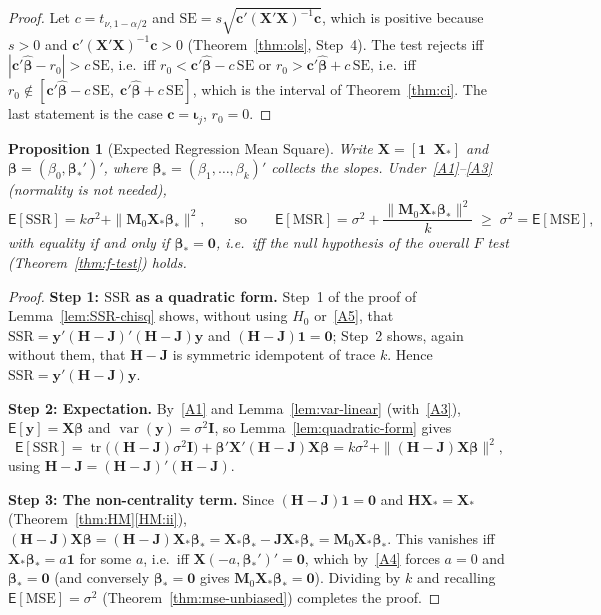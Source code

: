 \documentclass[14pt]{extarticle}
\theoremstyle{plain}
\newtheorem{proposition}[theorem]{Proposition}
\theoremstyle{definition}
\theoremstyle{remark}
\newcommand\expc{\mathsf{E}}
\DeclareMathOperator\var{var}
\DeclareMathOperator\tr{tr}
\newcommand{\SSR}{\mathrm{SSR}}
\newcommand{\MSR}{\mathrm{MSR}}
\newcommand{\MSE}{\mathrm{MSE}}
\newcommand{\SE}{\mathrm{SE}}
\newcommand{\bX}{\mathbf{X}}
\newcommand{\by}{\mathbf{y}}
\def\bb{\boldsymbol{\beta}}
\newcommand{\bI}{\mathbf{I}}
\newcommand{\bH}{\mathbf{H}}
\newcommand{\bM}{\mathbf{M}}
\def\bc{\mathbf{c}}
\newcommand{\bone}{\mathbf{1}}
\newcommand{\bzero}{\mathbf{0}}
\newcommand{\bJ}{\mathbf{J}}
\begin{document}
\begin{proof}
Let $c = t_{\nu,1-\alpha/2}$ and $\SE = s\sqrt{\bc'(\bX'\bX)^{-1}\bc}$, which is positive because $s > 0$ and $\bc'(\bX'\bX)^{-1}\bc > 0$ (Theorem~\ref{thm:ols}, Step~4). The test rejects iff $|\bc'\hat{\bb} - r_0| > c\,\SE$, i.e.\ iff $r_0 < \bc'\hat{\bb} - c\,\SE$ or $r_0 > \bc'\hat{\bb} + c\,\SE$, i.e.\ iff $r_0 \notin [\bc'\hat{\bb} - c\,\SE,\; \bc'\hat{\bb} + c\,\SE]$, which is the interval of Theorem~\ref{thm:ci}. The last statement is the case $\bc = \boldsymbol\iota_j$, $r_0 = 0$.
\end{proof}

\begin{proposition}[Expected Regression Mean Square]\label{prop:E-SSR}
Write $\bX = [\bone \;\; \bX_*]$ and $\bb = (\beta_0, \bb_*')'$, where $\bb_* = (\beta_1, \ldots, \beta_k)'$ collects the slopes. Under~\ref{A1}--\ref{A3} (normality is not needed),
\[
\expc[\SSR] = k\sigma^2 + \|\bM_0\bX_*\bb_*\|^2, \qquad\text{so}\qquad \expc[\MSR] = \sigma^2 + \frac{\|\bM_0\bX_*\bb_*\|^2}{k} \;\geqslant\; \sigma^2 = \expc[\MSE],
\]
with equality if and only if $\bb_* = \bzero$, i.e.\ iff the null hypothesis of the overall $F$ test (Theorem~\ref{thm:f-test}) holds.
\end{proposition}

\begin{proof}
\textbf{Step 1: $\SSR$ as a quadratic form.} Step~1 of the proof of Lemma~\ref{lem:SSR-chisq} shows, without using $H_0$ or~\ref{A5}, that $\SSR = \by'(\bH - \bJ)'(\bH - \bJ)\by$ and $(\bH - \bJ)\bone = \bzero$; Step~2 shows, again without them, that $\bH - \bJ$ is symmetric idempotent of trace $k$. Hence $\SSR = \by'(\bH - \bJ)\by$.

\textbf{Step 2: Expectation.} By~\ref{A1} and Lemma~\ref{lem:var-linear} (with~\ref{A3}), $\expc[\by] = \bX\bb$ and $\var(\by) = \sigma^2\bI$, so Lemma~\ref{lem:quadratic-form} gives
\[
\expc[\SSR] = \tr\bigl((\bH - \bJ)\sigma^2\bI\bigr) + \bb'\bX'(\bH - \bJ)\bX\bb = k\sigma^2 + \|(\bH - \bJ)\bX\bb\|^2,
\]
using $\bH - \bJ = (\bH - \bJ)'(\bH - \bJ)$.

\textbf{Step 3: The non-centrality term.} Since $(\bH - \bJ)\bone = \bzero$ and $\bH\bX_* = \bX_*$ (Theorem~\ref{thm:HM}\ref{HM:ii}), $(\bH - \bJ)\bX\bb = (\bH - \bJ)\bX_*\bb_* = \bX_*\bb_* - \bJ\bX_*\bb_* = \bM_0\bX_*\bb_*$. This vanishes iff $\bX_*\bb_* = a\bone$ for some $a$, i.e.\ iff $\bX(-a, \bb_*')' = \bzero$, which by~\ref{A4} forces $a = 0$ and $\bb_* = \bzero$ (and conversely $\bb_* = \bzero$ gives $\bM_0\bX_*\bb_* = \bzero$). Dividing by $k$ and recalling $\expc[\MSE] = \sigma^2$ (Theorem~\ref{thm:mse-unbiased}) completes the proof.
\end{proof}
\end{document}

